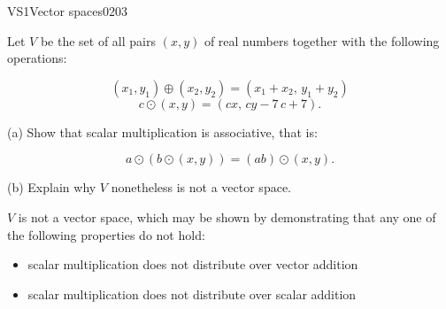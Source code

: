 \begin{exercise}{VS1}{Vector spaces}{0203} 
\begin{exerciseStatement} 

 Let \(V\) be the set of all pairs \((x,y)\) of real numbers together with the following operations: 

 \[(x_1,y_1)\oplus (x_2,y_2)=\left(x_{1} + x_{2},\,y_{1} + y_{2}\right)\]\[c \odot (x,y) =\left(c x,\,c y - 7 \, c + 7\right).\] 

 (a) Show that scalar multiplication is associative, that is: 

 \[
      a\odot(b\odot (x,y))=(ab)\odot(x,y).
    \] 

 (b) Explain why \(V\) nonetheless is not a vector space. 

 \end{exerciseStatement}
 \begin{exerciseAnswer} 

 \(V\) is not a vector space, which may be shown by demonstrating that any one of the following properties do not hold: 

 

\begin{itemize}
\item scalar multiplication does not distribute over vector addition
\item scalar multiplication does not distribute over scalar addition
\end{itemize}

     \end{exerciseAnswer}
 \end{exercise}



